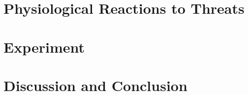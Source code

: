 


%
\fancyhf{}

\fancyhead[L]{\fontsize{8}{12}\selectfont\navnA, \navnB, \navnC, \navnD, \navnE \\}
\fancyhead[R]{\fontsize{8}{12}\selectfont\ptitle}

\cfoot{\thepage}

\usepackage{titlesec}
\titleformat{\chapter}[hang] 
{\normalfont\huge\bfseries}{\chaptertitlename\ \thechapter:}{1em}{} 



\pagestyle{empty}


\setcounter{page}{1}
\pagestyle{fancy}
%
%



\renewcommand{\cleardoublepage}{}


\chapter{Physiological Reactions to Threats}
	
	
	
	

\chapter{Experiment}
	
	
	
\chapter{Discussion and Conclusion}
	
	
	
